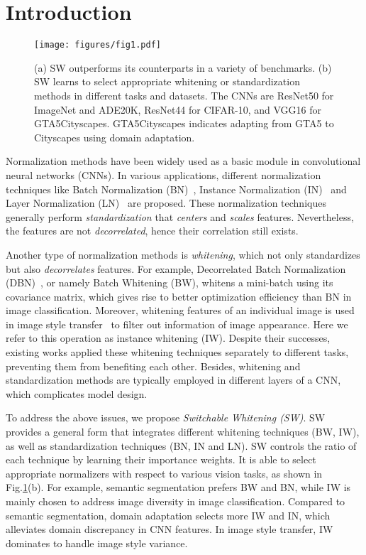 \documentclass[10pt,twocolumn,letterpaper]{article}
\begin{document}
\section{Introduction}

\begin{figure}[!t]
	\centering
	\texttt{[image: figures/fig1.pdf]}
	\vspace{-0.3cm}
	\caption{\label{Fig1} (a) SW outperforms its counterparts in a variety of benchmarks. (b) SW learns to select appropriate whitening or standardization methods in different tasks and datasets. The CNNs are ResNet50 for ImageNet and ADE20K, ResNet44 for CIFAR-10, and VGG16 for GTA5Cityscapes.
		GTA5Cityscapes indicates adapting from GTA5 to Cityscapes using domain adaptation.} \vspace{-0.3cm}
\end{figure}


Normalization methods have been widely used as a basic module in convolutional neural networks (CNNs).
In various applications, different normalization techniques like Batch Normalization (BN)~\cite{ioffe2015batch}, Instance Normalization (IN)~\cite{ulyanov2017improved} and Layer Normalization (LN)~\cite{ba2016layer} are proposed.
These normalization techniques generally perform \textit{standardization} that \textit{centers} and \textit{scales} features.
Nevertheless, the features are not \textit{decorrelated}, hence their correlation still exists.


Another type of normalization methods is \textit{whitening}, which not only standardizes but also \textit{decorrelates} features. 
For example, Decorrelated Batch Normalization (DBN)~\cite{lei2018decorrelated}, or namely Batch Whitening (BW), whitens a mini-batch using its covariance matrix, which gives rise to better optimization efficiency than BN in image classification.
Moreover, whitening features of an individual image is used in image style transfer~\cite{li2017universal} to filter out information of image appearance.
Here we refer to this operation as instance whitening (IW).
Despite their successes, existing works applied these whitening techniques separately to different tasks, preventing them from benefiting each other.
Besides, whitening and standardization methods are typically employed in different layers of a CNN, which complicates model design.

To address the above issues, we propose \textit{Switchable Whitening (SW)}.
SW provides a general form that integrates different whitening techniques (\eg BW, IW), as well as standardization techniques (\eg BN, IN and LN). SW controls the ratio of each technique by learning their importance weights.
It is able to select appropriate normalizers with respect to various vision tasks, as shown in Fig.\ref{Fig1}(b).
For example, semantic segmentation prefers BW and BN, while IW is mainly chosen to address image diversity in image classification.
Compared to semantic segmentation, domain adaptation selects more IW and IN, which alleviates domain discrepancy in CNN features.
In image style transfer, IW dominates to handle image style variance.
\end{document}
